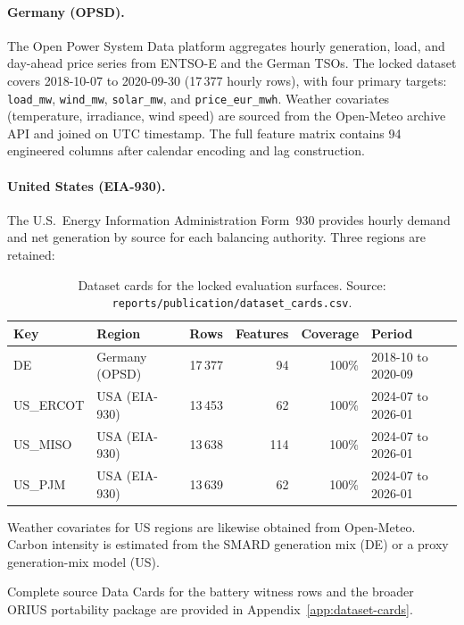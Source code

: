 \paragraph{Germany (OPSD).}
The Open Power System Data platform aggregates hourly generation, load, and
day-ahead price series from ENTSO-E and the German TSOs.  The locked dataset
covers 2018-10-07 to 2020-09-30 (17\,377 hourly rows), with four primary
targets: \texttt{load\_mw}, \texttt{wind\_mw}, \texttt{solar\_mw}, and
\texttt{price\_eur\_mwh}.  Weather covariates (temperature, irradiance, wind
speed) are sourced from the Open-Meteo archive API and joined on UTC
timestamp.  The full feature matrix contains 94 engineered columns after
calendar encoding and lag construction.

\paragraph{United States (EIA-930).}
The U.S.\ Energy Information Administration Form~930 provides hourly
demand and net generation by source for each balancing authority.  Three
regions are retained:

\begin{table}[ht]
\centering
\caption{Dataset cards for the locked evaluation surfaces.  Source:
\texttt{reports/publication/dataset\_cards.csv}.}
\label{tab:dataset-cards}
\begin{tabular}{llrrrl}
\toprule
\textbf{Key} & \textbf{Region} & \textbf{Rows} & \textbf{Features} &
  \textbf{Coverage} & \textbf{Period} \\
\midrule
DE       & Germany (OPSD)    & 17\,377 & 94  & 100\% & 2018-10 to 2020-09 \\
US\_ERCOT & USA (EIA-930)    & 13\,453 & 62  & 100\% & 2024-07 to 2026-01 \\
US\_MISO  & USA (EIA-930)    & 13\,638 & 114 & 100\% & 2024-07 to 2026-01 \\
US\_PJM   & USA (EIA-930)    & 13\,639 & 62  & 100\% & 2024-07 to 2026-01 \\
\bottomrule
\end{tabular}
\end{table}

Weather covariates for US regions are likewise obtained from Open-Meteo.
Carbon intensity is estimated from the SMARD generation mix (DE) or a
proxy generation-mix model (US).

Complete source Data Cards for the battery witness rows and the broader
ORIUS portability package are provided in Appendix~\ref{app:dataset-cards}.

